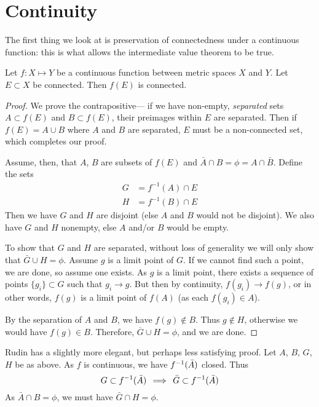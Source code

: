 \documentclass{article}
\begin{document}
{\Huge {}}

\section{Continuity}
The first thing we look at is preservation of connectedness under a
continuous function: this is what allows the intermediate value theorem
to be true.
\begin{thm}
  Let $f: X \mapsto Y$ be a continuous function between metric spaces $X$
  and $Y$. Let $E \subset X$ be connected. Then $f(E)$ is connected.
\end{thm}
\begin{proof}
  We prove the contrapositive--- if we have non-empty, \emph{separated} sets
  $A \subset f(E)$ and $B \subset f(E)$,
  their preimages within $E$ are separated. Then if
  \(f(E) = A \cup B\) where $A$ and $B$ are separated, $E$ must be a
  non-connected set, which completes our proof.

  Assume, then, that $A$, $B$ are subsets of $f(E)$ and
  $\bar{A}\cap B = \phi = A \cap \bar{B}$. Define the sets
  \begin{eqnarray*}
    G & = f^{-1}(A) \cap E \\
    H & = f^{-1}(B) \cap E
  \end{eqnarray*}
  Then we have $G$ and $H$ are disjoint (else $A$ and $B$ would not be
  disjoint). We also have $G$ and $H$ nonempty, else $A$ and/or $B$
  would be empty.

  To show that $G$ and $H$ are separated, without loss of generality we
  will only show that $\bar G \cup H = \phi$. Assume $g$ is a limit
  point of $G$. If we cannot find such a point, we
  are done, so assume one exists. As $g$ is a limit point, there exists
  a sequence of points $\{g_i\} \subset G$ such that
  $g_i \rightarrow g$. But then by continuity,
  $f(g_i) \rightarrow f(g)$, or in other words, $f(g)$ is a limit point
  of $f(A)$ (as each $f(g_i) \in A$).

  By the separation of $A$ and $B$, we have $f(g)\not\in B$. Thus
  $g\not\in H$, otherwise we would have $f(g)\in B$. Therefore,
  $\overline G \cup H = \phi$, and we are done.
 
\end{proof}
\begin{note*}
  Rudin has a slightly more elegant, but perhaps less satisfying
  proof. Let $A$, $B$, $G$, $H$ be as above. As $f$ is continuous, we
  have ${f^{-1}}(\bar A)$ closed. Thus
  \[G \subset f^{-1}(\bar A) \,\implies\, \bar G \subset {f^{-1}}(\bar A) \]
  As $\bar A \cap B = \phi$, we must have $\bar G \cap H = \phi$.
\end{note*}
\end{document}
